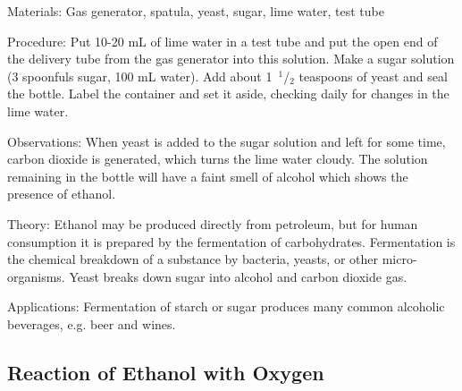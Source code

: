 \begin{multicols}{2}
\begin{description*}
\item[Materials:]{Gas generator, spatula, yeast, sugar, lime water, test tube}
\item[Procedure:]{Put 10-20 mL of lime water in a test tube and put the open end of the delivery tube from the gas generator into this solution. Make a sugar solution (3 spoonfuls sugar, 100 mL water). Add about 1~$^1$/$_2$ teaspoons of yeast and seal the bottle. Label the container and set it aside, checking daily for changes in the lime water.}
\item[Observations:]{When yeast is added to the sugar solution and left for some time, carbon dioxide is generated, which turns the lime water cloudy. The solution remaining in the bottle will have a faint smell of alcohol which shows the presence of ethanol.}
\item[Theory:]{Ethanol may be produced directly from petroleum, but for human consumption it is prepared by the fermentation of carbohydrates. Fermentation is the chemical breakdown of a substance by bacteria, yeasts, or other micro-organisms. Yeast breaks down sugar into alcohol and carbon dioxide gas.}
\item[Applications:]{Fermentation of starch or sugar produces many common alcoholic beverages, e.g. beer and wines.}
\end{description*}

\vfill
\columnbreak

\subsection{Reaction of Ethanol with Oxygen}



\end{multicols}
